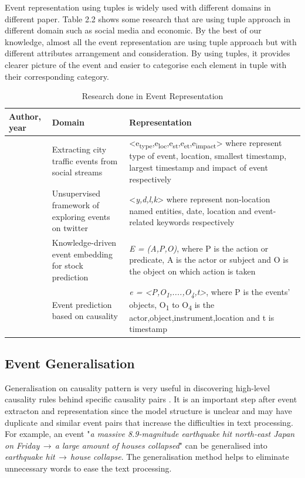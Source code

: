 \documentclass[twoside]{utmthesis}
\begin{document}
Event representation using tuples is widely used with different domains in different paper. Table 2.2 shows some research that are using tuple approach in different domain such as social media and economic. By the best of our knowledge, almost all the event representation are using tuple approach but with different attributes arrangement and consideration. By using tuples, it provides clearer picture of the event and easier to categorise each element in tuple with their corresponding category. 

\begin{table}[H]
	\fontsize{11}{12}\selectfont
	\caption{Research done in Event Representation}
	\renewcommand{\arraystretch}{1.2}
	\begin{tabular}{|p{3cm} |p{4cm} |p{7cm}|}
		\hline 
		Author, year & Domain & Representation \\ 
		\hline 
		\citep{anantharam2015extracting}&Extracting city traffic events from social streams & <e\textsubscript{type},e\textsubscript{loc},e\textsubscript{st},e\textsubscript{et},e\textsubscript{impact}> where represent type of event, location, smallest timestamp, largest timestamp and impact of event respectively \\ 
		\hline 
		\citep{zhou2015unsupervised}&Unsupervised framework of exploring events on twitter  & <\textit{y,d,l,k}> where represent non-location named entities, date, location and event-related keywords respectively \\ 
		\hline 
		\citep{ding2016knowledge}& Knowledge-driven event embedding for stock prediction & \textit{E = (A,P,O)}, where P is the action or predicate, A is the actor or subject and O is the object on which action is taken \\ 
		\hline
		\citep{radinsky2012learning} & Event prediction based on causality & \textit{e = <P,O\textsubscript{1},....,O\textsubscript{4},t>}, where P is the events' objects, O\textsubscript{1} to O\textsubscript{4} is the actor,object,instrument,location and t is timestamp \\
		\hline
	\end{tabular} 
\end{table}
\vspace{-1.5cm}

\subsection{Event Generalisation}
Generalisation on causality pattern is very useful in discovering high-level causality rules behind specific causality pairs \citep{zhao2017constructing}. It is an important step after event extracton and representation since the model structure is unclear and may have duplicate and similar event pairs that increase the difficulties in text processing. For example, an event "\textit{a massive 8.9-magnitude earthquake hit north-east Japan on Friday}$\,\to\,$\textit{a large amount of houses collapsed}" can be generalised into \textit{earthquake hit}$\,\to\,$\textit{house collapse}. The generalisation method helps to eliminate unnecessary words to ease the text processing. 
\end{document}
